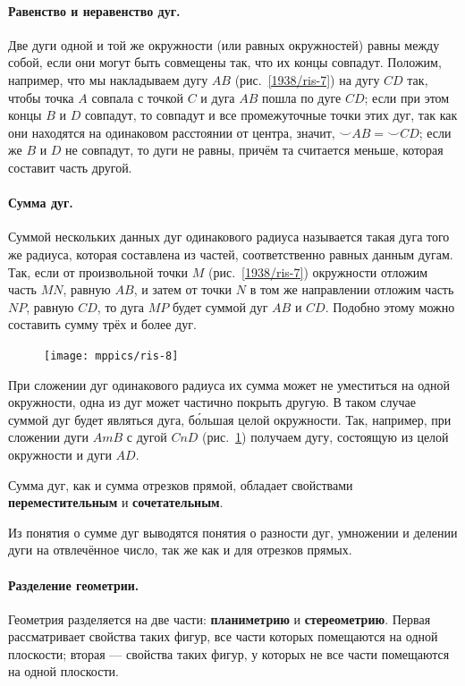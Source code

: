 \documentclass[oneside]{book}
\begin{document}
\paragraph{Равенство и неравенство дуг.}\label{1938/10}
Две дуги одной и той же окружности (или равных окружностей) равны между собой, если они могут быть совмещены так, что их концы совпадут.
Положим, например, что мы накладываем дугу $AB$ (рис.~\ref{1938/ris-7}) на дугу $CD$ так, чтобы точка $A$ совпала с точкой $C$ и дуга $AB$ пошла по дуге $CD$;
если при этом концы $B$ и $D$ совпадут, то совпадут и все промежуточные точки этих дуг, так как они находятся на одинаковом расстоянии от центра, значит, ${\smallsmile} AB={\smallsmile} CD$;
если же $B$ и $D$ не совпадут, то дуги не равны, причём та считается меньше, которая составит часть другой.

\paragraph{Сумма дуг.}\label{1938/11}
Суммой нескольких данных дуг одинакового радиуса называется такая дуга того же радиуса, которая составлена из частей, соответственно равных данным дугам.
Так, если от произвольной точки $M$ (рис.~\ref{1938/ris-7}) окружности отложим часть $MN$, равную $AB$, и затем от точки $N$ в том же направлении отложим часть $NP$, равную $CD$, то дуга $MP$ будет суммой дуг $AB$ и $CD$.
Подобно этому можно составить сумму трёх и более дуг.

\begin{figure}[h!]
\centering
\texttt{[image: mppics/ris-8]}
\caption{}\label{1938/ris-8}
\end{figure}

При сложении дуг одинакового радиуса их сумма может не уместиться на одной окружности, одна из дуг может частично покрыть другую.
В таком случае суммой дуг будет являться дуга, б\'{о}льшая целой окружности.
Так, например, при сложении дуги $AmB$ с дугой $CnD$ (рис.~\ref{1938/ris-8}) получаем дугу, состоящую из целой окружности и дуги $AD$.


Сумма дуг, как и сумма отрезков прямой, обладает свойствами \textbf{переместительным} и \textbf{сочетательным}.

Из понятия о сумме дуг выводятся понятия о разности дуг, умножении и делении дуги на отвлечённое число, так же как и для отрезков прямых.


\paragraph{Разделение геометрии.}\label{1938/12}
Геометрия разделяется на две части:
\textbf{планиметрию} и \textbf{стереометрию}.
Первая рассматривает свойства таких фигур, все части которых помещаются на одной плоскости;
вторая — свойства таких фигур, у которых не все части помещаются на одной плоскости.
\end{document}
